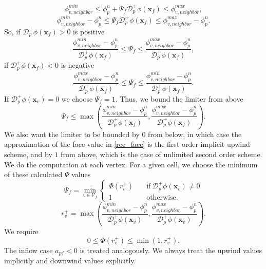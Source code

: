 \documentclass{article}
\begin{document}
\[
	\phi_{v, neighbor}^{min} 
	\leq 
	\phi_p^n + \Psi_{f}\mathcal{D}^+_p\phi (\boldsymbol{x}_{f}) 
	\leq 
	\phi_{v, neighbor}^{max},
\]
\[
	\phi_{v, neighbor}^{min} -\phi_p^n 
	\leq  
	\Psi_{f}\mathcal{D}^+_p\phi (\boldsymbol{x}_{f}) 
	\leq 
	\phi_{v, neighbor}^{max} -\phi_p^n. 
\]
So, if $ \mathcal{D}^+_p\phi (\boldsymbol{x}_{f}) > 0 $ is positive
\[
	\frac{\phi_{v, neighbor}^{min} - \phi_p^n}{\mathcal{D}^+_p\phi (\boldsymbol{x}_{f})} 
	\leq  
	\Psi_{f}
	\leq
	\frac{\phi_{v, neighbor}^{max} - \phi_p^n}{\mathcal{D}^+_p\phi (\boldsymbol{x}_{f})},
\]
if $ \mathcal{D}^+_p\phi (\boldsymbol{x}_{f}) < 0 $ is negative
\[
	\frac{\phi_{v, neighbor}^{max} - \phi_p^n}{\mathcal{D}^+_p\phi (\boldsymbol{x}_{f})} 
	\leq  
	\Psi_{f}
	\leq 
	\frac{\phi_{v, neighbor}^{min} - \phi_p^n}{\mathcal{D}^+_p\phi (\boldsymbol{x}_{f})}.
\]
If $ \mathcal{D}^+_p\phi (\boldsymbol{x}_{v}) = 0 $ we choose $ \Psi_{f} = 1 $.
Thus, we bound the limiter from above
\[ 
	\Psi_{f}
	\leq
	\max \left(
		\frac{\phi_{v, neighbor}^{min} -\phi_p^n}{\mathcal{D}^+_p\phi (\boldsymbol{x}_{f})},
		\frac{\phi_{v, neighbor}^{max} -\phi_p^n}{\mathcal{D}^+_p\phi (\boldsymbol{x}_{f})}
		\right).
\]
We also want the limiter to be bounded by $ 0 $ from below, 
in which case the approximation of the face value in \eqref{rec_face} 
is the first order implicit upwind scheme, and by $ 1 $ from above, 
which is the case of unlimited second order scheme.
We do the computation at each vertex. For a given cell, 
we choose the minimum of these calculated $ \Psi $ values
\begin{equation}
	\Psi_{f} = 
	\min_{v \in \mathcal{V}_{f}}
	\begin{cases}
		\Phi(r_{v}^+) \quad 
		&\text{if} \ \mathcal{D}^+_p\phi (\boldsymbol{x}_{v}) \neq 0\\
		1 \quad &\text{otherwise}.
	\end{cases}
\end{equation}
\[
	r_{v}^+ = 
	\max \left(
		\frac{\phi_{v, neighbor}^{min} -\phi_p^n}{\mathcal{D}^+_p\phi (\boldsymbol{x}_{v})},
		 \frac{\phi_{v, neighbor}^{max} -\phi_p^n}{\mathcal{D}^+_p\phi (\boldsymbol{x}_{v})}
		 \right). 
\]
We require
\[ 
	0 \leq \Phi(r_{v}^+) \leq \min(1, r_{v}^+).
\]
The inflow case $ a_{pf} < 0 $ is treated analogously. 
We always treat the upwind values implicitly and downwind values explicitly.
\newpage
\end{document}
